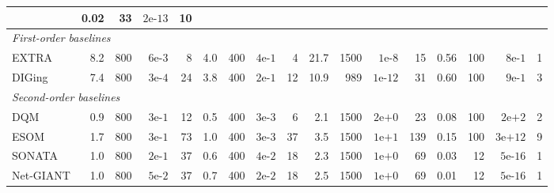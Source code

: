\documentclass[10pt,twocolumn,letterpaper]{article}
\theoremstyle{compact}
\theoremstyle{compactremark}
\begin{document}
\begin{table}[t]
{\begin{tabular}{l rrrr rrrr rrrr rrrr}
				& 0.02 & 33  & $2\text{e-}13$ & 10 \\
				\midrule
				\multicolumn{17}{l}{\textit{First-order baselines}} \\
				EXTRA  & 8.2 & 800 & $6\text{e-}3$  & 8
				& 4.0 & 400 & $4\text{e-}1$  & 4
				& 21.7 & 1500 & $1\text{e-}8$  & 15
				& 0.56 & 100 & $8\text{e-}1$  & 1 \\
				DIGing & 7.4 & 800 & $3\text{e-}4$  & 24
				& 3.8 & 400 & $2\text{e-}1$  & 12
				& 10.9 & 989 & $1\text{e-}12$ & 31
				& 0.60 & 100 & $9\text{e-}1$  & 3 \\
				\midrule
				\multicolumn{17}{l}{\textit{Second-order baselines}} \\
				DQM    & 0.9 & 800 & $3\text{e-}1$  & 12
				& 0.5 & 400 & $3\text{e-}3$  & 6
				& 2.1 & 1500 & $2\text{e+}0$  & 23
				& 0.08 & 100 & $2\text{e+}2$  & 2 \\
				ESOM   & 1.7 & 800 & $3\text{e-}1$  & 73
				& 1.0 & 400 & $3\text{e-}3$  & 37
				& 3.5 & 1500 & $1\text{e+}1$  & 139
				& 0.15 & 100 & $3\text{e+}12$ & 9 \\
				SONATA & 1.0 & 800 & $2\text{e-}1$  & 37
				& 0.6 & 400 & $4\text{e-}2$  & 18
				& 2.3 & 1500 & $1\text{e+}0$  & 69
				& 0.03 & 12  & $5\text{e-}16$ & 1 \\
				Net-GIANT & 1.0 & 800 & $5\text{e-}2$ & 37
				& 0.7 & 400 & $2\text{e-}2$  & 18
				& 2.5 & 1500 & $1\text{e+}0$  & 69
				& 0.01 & 12  & $5\text{e-}16$ & 1 \\
				\bottomrule
		\end{tabular}}
	\end{table}
	
\end{document}
